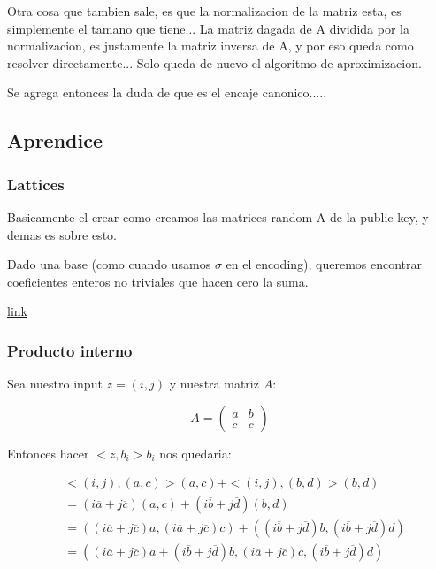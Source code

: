 \documentclass[12pt, oneside]{article}
\begin{document}
Otra cosa que tambien sale, es que la normalizacion de la matriz esta, es simplemente el tamano que tiene...
La matriz dagada de A dividida por la normalizacion, es justamente la matriz inversa de A, y por eso queda como
resolver directamente... Solo queda de nuevo el algoritmo de aproximizacion.

Se agrega entonces la duda de que es el encaje canonico.....



\subsection{Aprendice}
\subsubsection{Lattices}
Basicamente el crear como creamos las matrices random A de la public key, y demas
es sobre esto.

Dado una base (como cuando usamos $\sigma$ en el encoding), queremos encontrar
coeficientes enteros no triviales que hacen cero la suma.

\href{https://www.youtube.com/watch?v=FVFw_qb1ZkY}{link}
\subsubsection{Producto interno}
Sea nuestro input $z=(i, j)$ y nuestra matriz $A$:

\begin{equation*}
    A=
    \begin{pmatrix}
        a & b  \\
        c & c
    \end{pmatrix}
    \label{eq:ejA}
\end{equation*}

Entonces hacer $<z,b_i>b_i$ nos quedaria:

\begin{equation*}
    \begin{split}
        &<(i,j),(a,c)>(a,c) + <(i,j),(b,d)>(b,d) \\
        &=(i\overline{a} + j\overline{c})(a,c)+(i\overline{b} + j\overline{d})(b,d)\\
        &=((i\overline{a} + j\overline{c})a,(i\overline{a} + j\overline{c})c)+((i\overline{b} + j\overline{d})b,(i\overline{b} + j\overline{d})d)\\
        &= ((i\overline{a} + j\overline{c})a+(i\overline{b} + j\overline{d})b,(i\overline{a} + j\overline{c})c,(i\overline{b} + j\overline{d})d)
    \end{split}
    \label{eq:ej}
\end{equation*}
\end{document}
